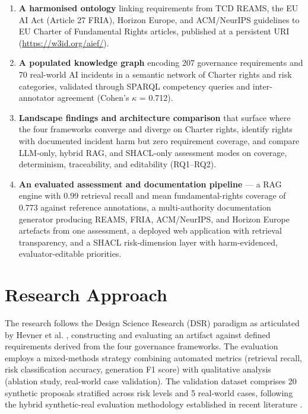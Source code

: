 \begin{enumerate}
\item \textbf{A harmonised ontology} linking requirements from TCD REAMS, the EU AI Act (Article 27 FRIA), Horizon Europe, and ACM/NeurIPS guidelines to EU Charter of Fundamental Rights articles, published at a persistent URI (\url{https://w3id.org/aief/}).

\item \textbf{A populated knowledge graph} encoding 207 governance requirements and 70 real-world AI incidents in a semantic network of Charter rights and risk categories, validated through SPARQL competency queries and inter-annotator agreement (Cohen's $\kappa$ = 0.712).

\item \textbf{Landscape findings and architecture comparison} that surface where the four frameworks converge and diverge on Charter rights, identify rights with documented incident harm but zero requirement coverage, and compare LLM-only, hybrid RAG, and SHACL-only assessment modes on coverage, determinism, traceability, and editability (RQ1--RQ2).

\item \textbf{An evaluated assessment and documentation pipeline} --- a RAG engine with 0.99 retrieval recall and mean fundamental-rights coverage of 0.773 against reference annotations, a multi-authority documentation generator producing REAMS, FRIA, ACM/NeurIPS, and Horizon Europe artefacts from one assessment, a deployed web application with retrieval transparency, and a SHACL risk-dimension layer with harm-evidenced, evaluator-editable priorities.
\end{enumerate}


\section{Research Approach}

The research follows the Design Science Research (DSR) paradigm as articulated by Hevner et al. \cite{hevner2004}, constructing and evaluating an artifact against defined requirements derived from the four governance frameworks. The evaluation employs a mixed-methods strategy combining automated metrics (retrieval recall, risk classification accuracy, generation F1 score) with qualitative analysis (ablation study, real-world case validation). The validation dataset comprises 20 synthetic proposals stratified across risk levels and 5 real-world cases, following the hybrid synthetic-real evaluation methodology established in recent literature \cite{pasta2026, invisiblebench2025, autocontrolarena2025}.



